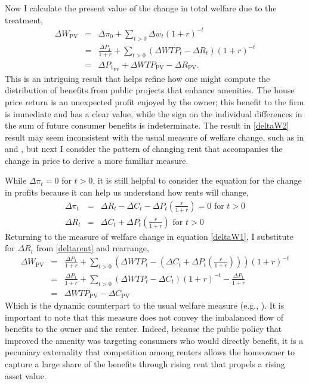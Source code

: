 \documentclass[ecta,nameyear,draft]{econsocart}
\theoremstyle{plain}
\theoremstyle{remark}
\begin{document}
Now I calculate the present value of the change in total welfare due to the treatment,
\begin{eqnarray}
	\Delta W_{\mathrm{PV}}&=&\Delta \pi_0+\sum_{t>0}\Delta w_t(1+r)^{-t}\nonumber\\
	&=&\frac{\Delta P_1}{1+r}+\sum_{t>0} (\Delta \mathit{WTP}_t-\Delta R_t)(1+r)^{-t} \label{deltaW1}\\
	&=&\Delta P_{1_{\mathrm{PV}}}+\Delta\mathit{WTP}_\mathrm{PV}-\Delta R_{\mathrm{PV}}.\label{deltaW2}
\end{eqnarray}
This is an intriguing result that helps refine how one might compute the distribution of benefits from public projects that enhance amenities. The house price return is an unexpected profit enjoyed by the owner; this benefit to the firm is immediate and has a clear value, while the sign on the individual differences in the sum of future consumer benefits is indeterminate. The result in \ref{deltaW2} result may seem inconsistent with the usual measure of welfare change, such as in \cite{freeman14} and \cite{banzhaf20}, but next I consider the pattern of changing rent that accompanies the change in price to derive a more familiar measure. 

While $\Delta\pi_t=0$ for $t>0$, it is still helpful to consider the equation for the change in profits because it can help us understand how rents will change,
\begin{eqnarray}
	\Delta \pi_t &=& \Delta R_t-\Delta C_t-\Delta P_t\left(\frac{r}{1+r}\right)=0 \text{ for } t>0\nonumber\\
	\Delta R_t &=& \Delta C_t+\Delta P_t \left(\frac{r}{1+r}\right)  \text{ for } t>0\label{deltarent}
\end{eqnarray}
Returning to the measure of welfare change in equation \ref{deltaW1}, I substitute for $\Delta R_t$  from \ref{deltarent} and rearrange,
\begin{eqnarray}
	\Delta W_{\mathrm{PV}}&=&\frac{\Delta P_1}{1+r}+\sum_{t>0} \left(\Delta \mathit{WTP}_t-\left(\Delta C_t+\Delta P_t \left(\frac{r}{1+r}\right)\right)\right)(1+r)^{-t} \nonumber\\
	&=&\frac{\Delta P_1}{1+r}+\sum_{t>0} (\Delta \mathit{WTP}_t-\Delta C_t)(1+r)^{-t}-\frac{\Delta P_1}{1+r}\nonumber\\
	&=&\Delta \mathit{WTP}_{\mathrm{PV}}-\Delta C_{\mathrm{PV}}\nonumber %
\end{eqnarray}
Which is the dynamic counterpart to the usual welfare measure (e.g., \cite{freeman14}). It is important to note that this measure does not convey the imbalanced flow of benefits to the owner and the renter. Indeed, because the public policy that improved the amenity was targeting consumers who would directly benefit, it is a pecuniary externality that competition among renters allows the homeowner to capture a large share of the benefits through rising rent that propels a rising asset value.
\end{document}
